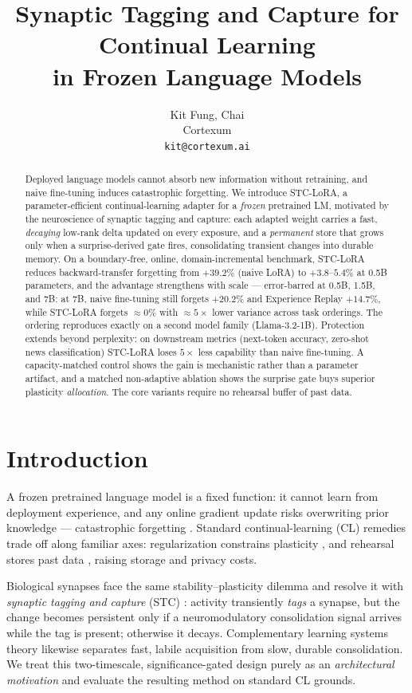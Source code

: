 \documentclass{article}
\title{Synaptic Tagging and Capture for Continual Learning\\in Frozen Language Models}
\author{Kit Fung, Chai\\Cortexum\\\texttt{kit@cortexum.ai}}
\date{}
\newcommand{\stc}{STC-LoRA}
\begin{document}
\maketitle

\begin{abstract}
Deployed language models cannot absorb new information without retraining, and naive fine-tuning induces catastrophic forgetting. We introduce \stc{}, a parameter-efficient continual-learning adapter for a \emph{frozen} pretrained LM, motivated by the neuroscience of synaptic tagging and capture: each adapted weight carries a fast, \emph{decaying} low-rank delta updated on every exposure, and a \emph{permanent} store that grows only when a surprise-derived gate fires, consolidating transient changes into durable memory. On a boundary-free, online, domain-incremental benchmark, \stc{} reduces backward-transfer forgetting from $+39.2\%$ (naive LoRA) to $+3.8$--$5.4\%$ at 0.5B parameters, and the advantage strengthens with scale --- error-barred at 0.5B, 1.5B, and 7B: at 7B, naive fine-tuning still forgets $+20.2\%$ and Experience Replay $+14.7\%$, while \stc{} forgets ${\approx}0\%$ with ${\approx}5\times$ lower variance across task orderings. The ordering reproduces exactly on a second model family (Llama-3.2-1B). Protection extends beyond perplexity: on downstream metrics (next-token accuracy, zero-shot news classification) \stc{} loses $5\times$ less capability than naive fine-tuning. A capacity-matched control shows the gain is mechanistic rather than a parameter artifact, and a matched non-adaptive ablation shows the surprise gate buys superior plasticity \emph{allocation}. The core variants require no rehearsal buffer of past data.
\end{abstract}

\section{Introduction}
A frozen pretrained language model is a fixed function: it cannot learn from deployment experience, and any online gradient update risks overwriting prior knowledge --- catastrophic forgetting \citep{mccloskey1989catastrophic}. Standard continual-learning (CL) remedies trade off along familiar axes: regularization constrains plasticity \citep{kirkpatrick2017overcoming,zenke2017continual}, and rehearsal stores past data \citep{rolnick2019experience}, raising storage and privacy costs.

Biological synapses face the same stability--plasticity dilemma and resolve it with \emph{synaptic tagging and capture} (STC) \citep{frey1997synaptic}: activity transiently \emph{tags} a synapse, but the change becomes persistent only if a neuromodulatory consolidation signal arrives while the tag is present; otherwise it decays. Complementary learning systems theory \citep{mcclelland1995there} likewise separates fast, labile acquisition from slow, durable consolidation. We treat this two-timescale, significance-gated design purely as an \emph{architectural motivation} and evaluate the resulting method on standard CL grounds.
\end{document}
